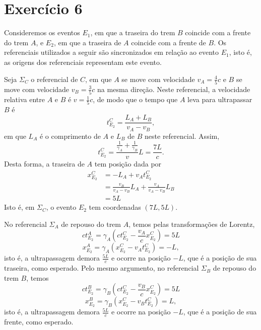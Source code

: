 \section*{Exercício 6}

Consideremos os eventos \(E_1\), em que a traseira do trem \(B\) coincide com a frente do trem \(A\), e \(E_2\), em que a traseira de \(A\) coincide com a frente de \(B\). Os referenciais utilizados a seguir são sincronizados em relação ao evento \(E_1\), isto é, as origens dos referenciais representam este evento.

Seja \(\Sigma_C\) o referencial de \(C\), em que \(A\) se move com velocidade \(v_A=\frac45c\) e \(B\) se move com velocidade \(v_B = \frac35c\) na mesma direção. Neste referencial, a velocidade relativa entre \(A\) e \(B\) é \(v = \frac15c\), de modo que o tempo que \(A\) leva para ultrapassar \(B\) é
\begin{equation*}
    t_{E_2}^C = \frac{L_A + L_B}{v_A - v_B},
\end{equation*}
em que \(L_A\) é o comprimento de \(A\) e \(L_B\) de \(B\) neste referencial. Assim,
\begin{equation*}
    t_{E_2}^C = \frac{\frac{1}{\gamma_A} + \frac{1}{\gamma_B}}{v}L = \frac{7L}{c}.
\end{equation*}
Desta forma, a traseira de \(A\) tem posição dada por
\begin{align*}
    x_{E_2}^C &= -L_A + v_At_{E_2}^C\\
              &= \frac{v_B}{v_A - v_B}L_A + \frac{v_A}{v_A - v_B}L_B\\
              &= 5L
\end{align*}
Isto é, em \(\Sigma_C\), o evento \(E_2\) tem coordenadas \(\left(7L, 5L\right)\).

No referencial \(\Sigma_A\) de repouso do trem \(A\), temos pelas transformações de Lorentz,
\begin{equation*}
    ct_{E_2}^A = \gamma_A \left(ct_{E_2}^C - \frac{v_A}{c}x_{E_2}^C\right) = 5L
\end{equation*}
\begin{equation*}
    x_{E_2}^A = \gamma_A \left(x_{E_2}^C - v_At_{E_2}^C\right) = -L,
\end{equation*}
isto é, a ultrapassagem demora \(\frac{5L}{c}\) e ocorre na posição \(-L\), que é a posição de sua traseira, como esperado. Pelo mesmo argumento, no referencial \(\Sigma_B\) de repouso do trem \(B\), temos
\begin{equation*}
    ct_{E_2}^B = \gamma_B \left(ct_{E_2}^C - \frac{v_B}{c}x_{E_2}^C\right) = 5L
\end{equation*}
\begin{equation*}
    x_{E_2}^B = \gamma_B \left(x_{E_2}^C - v_Bt_{E_2}^C\right) = L,
\end{equation*}
isto é, a ultrapassagem demora \(\frac{5L}{c}\) e ocorre na posição \(-L\), que é a posição de sua frente, como esperado.

